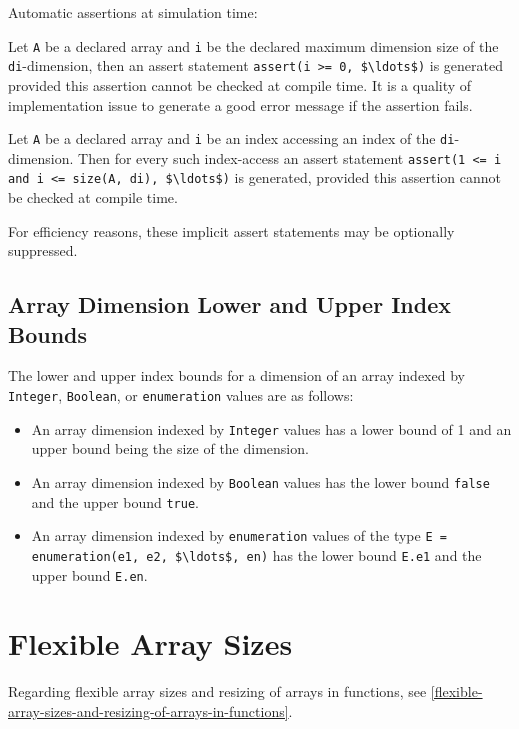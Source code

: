 \begin{nonnormative}
Automatic assertions at simulation time:

Let \lstinline!A! be a declared array and \lstinline!i! be the declared maximum dimension size of the \lstinline!di!-dimension, then an assert statement
\lstinline!assert(i >= 0, $\ldots$)! is generated provided this assertion cannot be checked at compile time.  It is a quality of implementation
issue to generate a good error message if the assertion fails.

Let \lstinline!A! be a declared array and \lstinline!i! be an index accessing an index of the \lstinline!di!-dimension.  Then for every such index-access an assert
statement \lstinline!assert(1 <= i and i <= size(A, di), $\ldots$)! is generated, provided this assertion cannot be checked at compile time.

For efficiency reasons, these implicit assert statements may be optionally suppressed.
\end{nonnormative}

\subsection{Array Dimension Lower and Upper Index Bounds}

The lower and upper index bounds for a dimension of an array indexed by \lstinline!Integer!, \lstinline!Boolean!, or \lstinline!enumeration! values are as follows:
\begin{itemize}
\item
  An array dimension indexed by \lstinline!Integer! values has a lower bound of 1 and an upper bound being the size of the dimension.
\item
  An array dimension indexed by \lstinline!Boolean! values has the lower bound \lstinline!false! and the upper bound \lstinline!true!.
\item
  An array dimension indexed by \lstinline!enumeration! values of the type \lstinline!E = enumeration(e1, e2, $\ldots$, en)!
  has the lower bound \lstinline!E.e1! and the upper bound \lstinline!E.en!.
\end{itemize}

\section{Flexible Array Sizes}

Regarding flexible array sizes and resizing of arrays in functions, see
\autoref{flexible-array-sizes-and-resizing-of-arrays-in-functions}.

